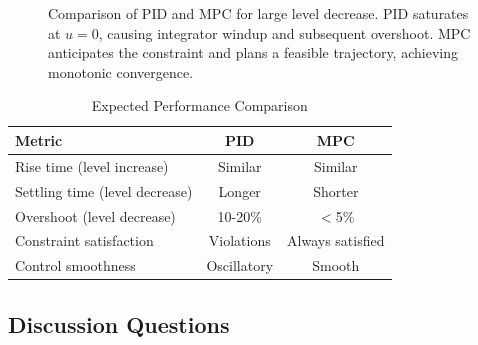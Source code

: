 \begin{figure}[htbp]
\caption{Comparison of PID and MPC for large level decrease. PID saturates at $u=0$, causing integrator windup and subsequent overshoot. MPC anticipates the constraint and plans a feasible trajectory, achieving monotonic convergence.}
\label{fig:pid_vs_mpc}
\end{figure}

\begin{table}[htbp]
\centering
\caption{Expected Performance Comparison}
\label{tab:performance}
\begin{tabular}{lcc}
\toprule
\textbf{Metric} & \textbf{PID} & \textbf{MPC} \\
\midrule
Rise time (level increase) & Similar & Similar \\
Settling time (level decrease) & Longer & Shorter \\
Overshoot (level decrease) & 10-20\% & $<$5\% \\
Constraint satisfaction & Violations & Always satisfied \\
Control smoothness & Oscillatory & Smooth \\
\bottomrule
\end{tabular}
\end{table}

\subsection{Discussion Questions}


